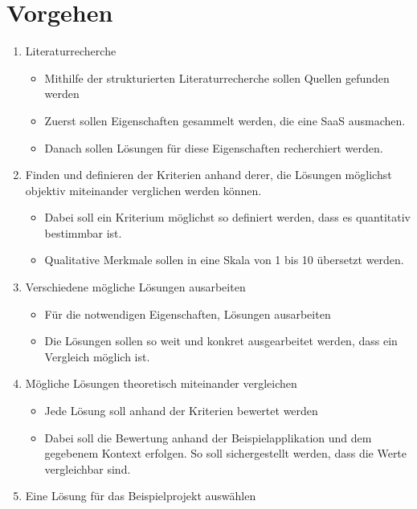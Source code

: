 \section{Vorgehen}\label{sec:vorgehen}

\begin{enumerate}
  \item Literaturrecherche
  \begin{itemize}
    \item Mithilfe der strukturierten Literaturrecherche sollen Quellen gefunden werden
    \item Zuerst sollen Eigenschaften gesammelt werden, die eine SaaS ausmachen.
    \item Danach sollen Lösungen für diese Eigenschaften recherchiert werden.
  \end{itemize}
\item
  Finden und definieren der Kriterien anhand derer, die Lösungen möglichst objektiv
  miteinander verglichen werden können.

  \begin{itemize}
  \item
    Dabei soll ein Kriterium möglichst so definiert werden, dass es
    quantitativ bestimmbar ist.
  \item
    Qualitative Merkmale sollen in eine Skala von 1 bis 10 übersetzt werden.
  \end{itemize}
\item
  Verschiedene mögliche Lösungen ausarbeiten

  \begin{itemize}
    \item Für die notwendigen Eigenschaften, Lösungen ausarbeiten
  \item
    Die Lösungen sollen so weit und konkret ausgearbeitet werden, dass ein Vergleich möglich ist.
  \end{itemize}
\item
  Mögliche Lösungen theoretisch miteinander vergleichen

  \begin{itemize}
  \item
    Jede Lösung soll anhand der Kriterien bewertet werden
  \item
    Dabei soll die Bewertung anhand der Beispielapplikation und dem
    gegebenem Kontext erfolgen.
    So soll sichergestellt werden, dass die
    Werte vergleichbar sind.
  \end{itemize}
\item Eine Lösung für das Beispielprojekt auswählen


\end{enumerate}
